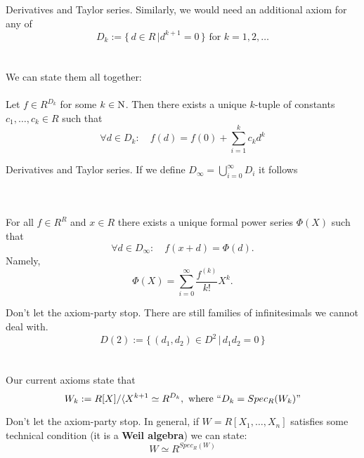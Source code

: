 \documentclass[handout, 11pt]{beamer}
\newenvironment{axiom}[1]
{\renewcommand\theinneraxiom{#1}\inneraxiom}
{\endinneraxiom}
\begin{document}
\begin{frame}{Derivatives and Taylor series.} 
	Similarly, we would need an additional axiom for any of
	\[ D_k := \{ \, d\in R \, | d^{k+1}=0 \, \} \text{ for } k=1,2,\dots  	\]
	\\~\\
	We can state them all together: \\~\\
	
	\begin{axiom}{$1^\prime$} Let $f\in R^{D_k}$ for some $k\in \N$. Then there exists 
		a unique $k$-tuple of constants $c_1,\dots, c_k\in R$ such that
		\[ \forall d\in D_k: \quad f(d)= f(0) + \sum_{i=1}^{k}c_k d^k \]
	\end{axiom}

\end{frame}

\begin{frame}{Derivatives and Taylor series.} 
	If we define $D_\infty=\bigcup_{i=0}^\infty D_i$ it follows\\~\\~\\
	\begin{theorem} 
		For all $f\in R^R$ and $x\in R$ there exists a unique formal power series $\Phi(X)$
		such that
		\[ \forall d\in D_\infty:  \quad f(x+d) = \Phi(d).\]
		Namely, 
		\[ \Phi(X) = \sum_{i=0}^\infty \frac{f^{(k)}}{k!} X^k.	\] 		
		
	\end{theorem}
\end{frame}

\begin{frame}{Don't let the axiom-party stop.} 
	There are still families of infinitesimals we cannot deal with.
	\[ D(2):=\{\, (d_1,d_2)\in D^2 \, | \, d_1d_2=0 \, \} \]
	\\~\\ 
	Our current axioms state that
	\[ W_k:=R[X]/\langle X^{k+1} \simeq R^{D_k}, \text{ where } ``D_k=Spec_R(W_k)" \]
 
\end{frame}

\begin{frame}{Don't let the axiom-party stop.} 	
	In general, if $W=R[X_1,\dots,X_n]$ satisfies some technical condition (it is a \textbf{Weil algebra}) 
	we can state:
	\begin{axiom}{w}~
	\[W\simeq R^{Spec_R(W)} \]
	\end{axiom}
\end{frame}
\end{document}
